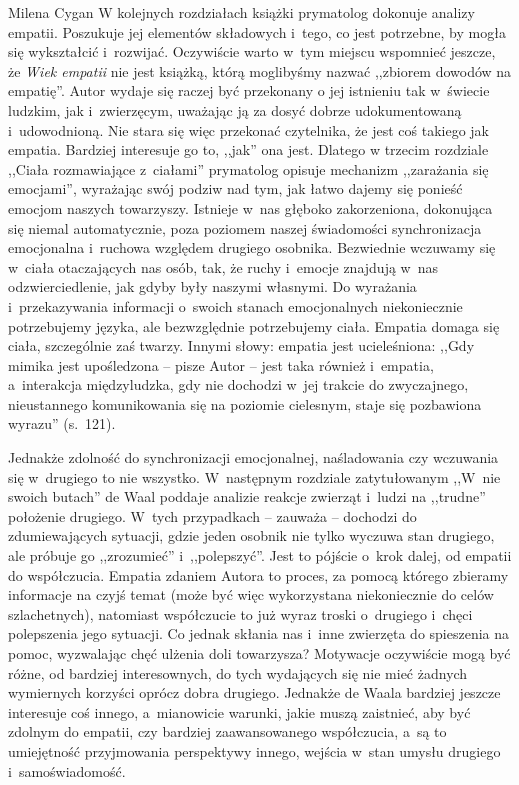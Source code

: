 \begin{recplenv}{Milena Cygan}
W kolejnych rozdziałach książki prymatolog dokonuje analizy empatii. Poszukuje jej elementów składowych i~tego, co jest
potrzebne, by mogła się wykształcić i~rozwijać. Oczywiście warto w~tym miejscu wspomnieć jeszcze, że \textit{Wiek
empatii} nie jest książką, którą moglibyśmy nazwać ,,zbiorem dowodów na empatię''. Autor wydaje się raczej być przekonany
o jej istnieniu tak w~świecie ludzkim, jak i~zwierzęcym, uważając ją za dosyć dobrze udokumentowaną i~udowodnioną. Nie
stara się więc przekonać czytelnika, że jest coś takiego jak empatia. Bardziej interesuje go to, ,,jak'' ona jest. Dlatego
w trzecim rozdziale ,,Ciała rozmawiające z~ciałami'' prymatolog opisuje mechanizm ,,zarażania się emocjami'', wyrażając
swój podziw nad tym, jak łatwo dajemy się ponieść emocjom naszych towarzyszy. Istnieje w~nas głęboko zakorzeniona,
dokonująca się niemal automatycznie, poza poziomem naszej świadomości synchronizacja emocjonalna i~ruchowa względem
drugiego osobnika. Bezwiednie wczuwamy się w~ciała otaczających nas osób, tak, że ruchy i~emocje znajdują w~nas
odzwierciedlenie, jak gdyby były naszymi własnymi. Do wyrażania i~przekazywania informacji o~swoich stanach
emocjonalnych niekoniecznie potrzebujemy języka, ale bezwzględnie potrzebujemy ciała. Empatia domaga się ciała,
szczególnie zaś twarzy. Innymi słowy: empatia jest ucieleśniona: ,,Gdy mimika jest upośledzona -- pisze Autor -- jest taka
również i~empatia, a~interakcja międzyludzka, gdy nie dochodzi w~jej trakcie do zwyczajnego, nieustannego komunikowania
się na poziomie cielesnym, staje się pozbawiona wyrazu'' (s.~121).

Jednakże zdolność do synchronizacji emocjonalnej, naśladowania czy wczuwania się w~drugiego to nie wszystko. W~następnym
rozdziale zatytułowanym ,,W~nie swoich butach'' de Waal poddaje analizie reakcje zwierząt i~ludzi na ,,trudne'' położenie
drugiego. W~tych przypadkach -- zauważa -- dochodzi do zdumiewających sytuacji, gdzie jeden osobnik nie tylko wyczuwa
stan drugiego, ale próbuje go ,,zrozumieć'' i~,,polepszyć''. Jest to pójście o~krok dalej, od empatii do współczucia.
Empatia zdaniem Autora to proces, za pomocą którego zbieramy informacje na czyjś temat (może być więc wykorzystana
niekoniecznie do celów szlachetnych), natomiast współczucie to już wyraz troski o~drugiego i~chęci polepszenia jego
sytuacji. Co jednak skłania nas i~inne zwierzęta do spieszenia na pomoc, wyzwalając chęć ulżenia doli towarzysza?
Motywacje oczywiście mogą być różne, od bardziej interesownych, do tych wydających się nie mieć żadnych wymiernych
korzyści oprócz dobra drugiego. Jednakże de Waala bardziej jeszcze interesuje coś innego, a~mianowicie warunki, jakie
muszą zaistnieć, aby być zdolnym do empatii, czy bardziej zaawansowanego współczucia, a~są to umiejętność przyjmowania
perspektywy innego, wejścia w~stan umysłu drugiego i~samoświadomość.


\end{recplenv}
